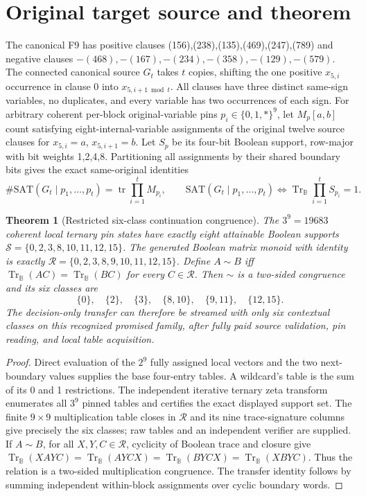 \documentclass[11pt]{article}
\newtheorem{theorem}{Theorem}
\begin{document}
\section{Original target source and theorem}
The canonical F9 has positive clauses (156),(238),(135),(469),(247),(789) and negative clauses $-(468),-(167),-(234),-(358),-(129),-(579)$. The connected canonical source $G_t$ takes $t$ copies, shifting the one positive $x_{5,i}$ occurrence in clause 0 into $x_{5,i+1\bmod t}$. All clauses have three distinct same-sign variables, no duplicates, and every variable has two occurrences of each sign. For arbitrary coherent per-block original-variable pins $p_i\in\{0,1,*\}^9$, let $M_p[a,b]$ count satisfying eight-internal-variable assignments of the original twelve source clauses for $x_{5,i}=a$, $x_{5,i+1}=b$. Let $S_p$ be its four-bit Boolean support, row-major with bit weights 1,2,4,8. Partitioning all assignments by their shared boundary bits gives the exact same-original identities
\[
\#\mathrm{SAT}(G_t\mid p_1,\ldots,p_t)=\operatorname{tr}\prod_{i=1}^t M_{p_i},\qquad
\mathrm{SAT}(G_t\mid p_1,\ldots,p_t)\iff \operatorname{Tr}_{\mathbb B}\prod_{i=1}^t S_{p_i}=1.
\]
\begin{theorem}[Restricted six-class continuation congruence]
The $3^9=19683$ coherent local ternary pin states have exactly eight attainable Boolean supports
\(\mathcal S=\{0,2,3,8,10,11,12,15\}\).
The generated Boolean matrix monoid with identity is exactly
\(\mathcal R=\{0,2,3,8,9,10,11,12,15\}\).
Define $A\sim B$ iff $\operatorname{Tr}_{\mathbb B}(AC)=\operatorname{Tr}_{\mathbb B}(BC)$ for every $C\in\mathcal R$.
Then $\sim$ is a two-sided congruence and its six classes are
\[
\boxed{\{0\},\quad\{2\},\quad\{3\},\quad\{8,10\},\quad\{9,11\},\quad\{12,15\}.}
\]
The decision-only transfer can therefore be streamed with only six contextual classes on this recognized promised family, after fully paid source validation, pin reading, and local table acquisition.
\end{theorem}
\begin{proof}
Direct evaluation of the $2^9$ fully assigned local vectors and the two next-boundary values supplies the base four-entry tables. A wildcard's table is the sum of its 0 and 1 restrictions. The independent iterative ternary zeta transform enumerates all $3^9$ pinned tables and certifies the exact displayed support set. The finite $9\times9$ multiplication table closes in $\mathcal R$ and its nine trace-signature columns give precisely the six classes; raw tables and an independent verifier are supplied. If $A\sim B$, for all $X,Y,C\in\mathcal R$, cyclicity of Boolean trace and closure give
\(\operatorname{Tr}_{\mathbb B}(XAYC)=\operatorname{Tr}_{\mathbb B}(AYCX)=\operatorname{Tr}_{\mathbb B}(BYCX)=\operatorname{Tr}_{\mathbb B}(XBYC)\).
Thus the relation is a two-sided multiplication congruence. The transfer identity follows by summing independent within-block assignments over cyclic boundary words.
\end{proof}
\end{document}
